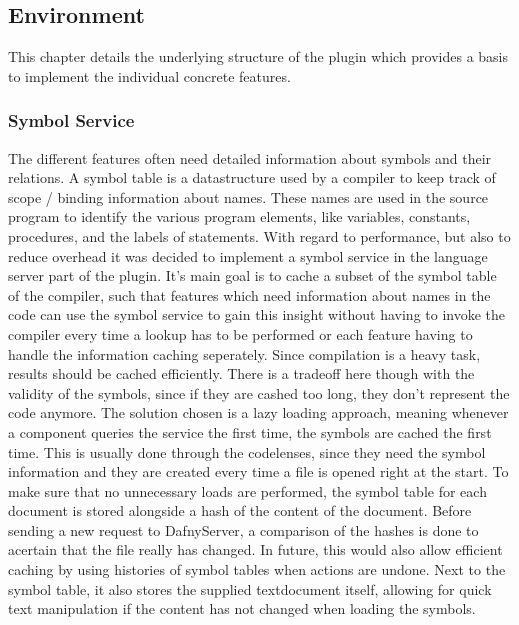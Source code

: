 \subsection{Environment}\label{environment}
This chapter details the underlying structure of the plugin which provides a basis to implement the individual concrete features.

\subsubsection{Symbol Service}\label{symbolservice}
The different features often need detailed information about symbols and their relations. A symbol table is a datastructure used by a compiler to keep track of scope / binding information about names. These names are used in the source program to identify the various program elements, like variables, constants, procedures, and the labels of statements.\cite[239]{compiler} \newline
With regard to performance, but also to reduce overhead it was decided to implement a symbol service in the language server part of the plugin. It's main goal is to cache a subset of the symbol table of the compiler, such that features which need information about names in the code can use the symbol service to gain this insight without having to invoke the compiler every time a lookup has to be performed or each feature having to handle the information caching seperately. \newline
Since compilation is a heavy task, results should be cached efficiently. There is a tradeoff here though with the validity of the symbols, since if they are cashed too long, they don't represent the code anymore. The solution chosen is a lazy loading approach, meaning whenever a component queries the service the first time, the symbols are cached the first time. This is usually done through the codelenses, since they need the symbol information and they are created every time a file is opened right at the start. To make sure that no unnecessary loads are performed, the symbol table for each document is stored alongside a hash of the content of the document. Before sending a new request to DafnyServer, a comparison of the hashes is done to acertain that the file really has changed. In future, this would also allow efficient caching by using histories of symbol tables when actions are undone. Next to the symbol table, it also stores the supplied textdocument itself, allowing for quick text manipulation if the content has not changed when loading the symbols.\newline
